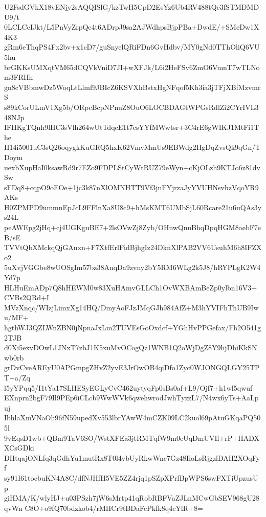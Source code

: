 U2FsdGVkX18vENjy2sAQQISlG/kzTwH5CpD2EsYz6Ub4RV488tQc3fSTMDMDU9/t
0LCLCeIJkt/L5PnVyZrpQe4t6ADrpJ9sa2AJWdhpsBjpPBa+DwdE/+SMeDw1X4K3
gRm6eThqPS4Fx2bv+x1cD7/guSnyelQRiFDn6GvHdbv/MY0gNd0TThOliQ6VU5hu
brGKKsUMXqtVM65dCQVkVniD7JI+wXFJk/L6i2HeFSv6ZmO6VmnT7wTLNom3FRHh
gn8cVBbmwDz5WoqLtLlmf9JBIcZ6KSVXhBstxHgNFqof5Kh3ia3jTFjXBfMzvmrS
s89kCorULmV1Xg5b/ORpcBcpNPnuZ8OuO6LOCBDAGtWPGsRdlZi2CYrIVL348NJp
IFHKgTQnh9lHC3sVlh264wUtTdqcE1t7csYYfMWwtsr+3C4rE6gWIKJ1MtFi1The
H14i5001uC3sQ26oqygkKuGRQ5hxK62VmvMmUs9EBWdg2HgDqZvsQk9qGn/TDoym
uexbXupHaI0ksawRd9r7EZo9FDPLStCyWtRUZ79eWyn+cKjOLzh9KTJo6z81dvSw
sFDq8+cqpO9oEOe+1jc3k87nXlOMNHTT9Vf3jnFYjrzaJyYVUHNsvhzVqoYR9AKs
H0ZPMPD9ummnEpJcL9FFlnXa8U8c9+hMsKMT6UMbSjL60Rcare21u6uQAs3ys24L
peAWEpg2jHq+cj4UGKguBE7+2lsOVwZj8Zyb/OHnwQnuBhqDpqHGM8aebF7eB/sE
TVVtQbXMckqQjGAnxn+F7XtfErlFidBjhgIz24DknXlPAB2VV6UsuhM6h8IFZXo2
5uXvjVGGbe8wUOSgIm57bz38AnqDa9zvny2bY5RM6WLg2k5J8/hRYPLgK2W4Yd7p
HLHuEmADp7Q8hHEWM0w83XuHAmvGLLCh1OvWXBAmBeZp0ylbn16V3+CVBs2QRd+I
MVzXnqc/WIzjLimxXg14HQ/DmyAoFJzJMqGJh984AfZ+M3hYVIFhThUB9Iwu/MF+
hgthWJ3QZLWnZBN0jNpnaJxLm2TUVEsGoOxdcf+YGhHvPPGefax/Fh2O541g2TJB
d0Xi5exvDOwL1JNxT7zbJ1K5xuMvOCogQz1WNB1Q2oWjDgZ8Y9hjDhiKkSNwb0rb
grDvCveAREyU0APGmpgZHvZ2yvE3JrOwOB4qiDfo1Zyc0WJONGQLGY25TPT+a/Zq
l5yYPqq5/I1tYa17SLHESyEGLyCvC462uytyqFp0sBs0af+L9/Ojf7+h1wl5qwuf
EXnprn2bgF79Il9PEp6iCLcb9WwWVk6qwehwrodJwhTyzzL7/N4wx6yTs+AaLpuj
IbhlaXmVNaOh96fN59upedXv553lbrYAwW4mCZK09LC2kuol69pAtuGKqaPQ505l
9vEqsD1wb+QBm9TaV6SO/WstXFEa3jtRMTqfW9m0eUqDmUVIl+rP+HADXXCsGDki
DHtqajONLfq3qGdhYu1mutRx8T0l4vbUyRkwWnc7Gz48IloLsRjgzlDAH2XOqFyf
sy91I61tocbuKN4A8C/dfNJHfH5VE5ZZ4rjq1pSZpXPrfBpWPS6swFXTiUpzusUp
giHMA/K/wlyHJ+u03PSzh7jW6sMrtp41qRobRBFVaZJLnMCwGbSEV968gU28qvWn
C8O+o9fQ70bdzkob4/rMHCr9tBDaFcPkfk8q4cYlR+8=
